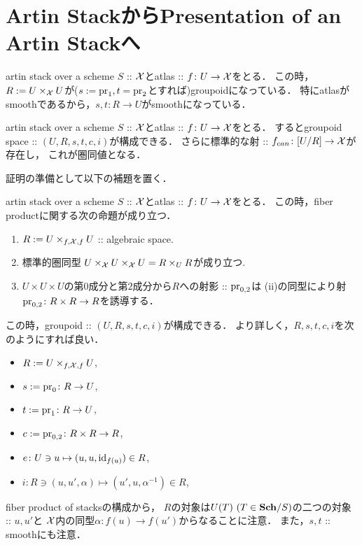 \documentclass[a4paper, dvipdfmx]{jsarticle}
\begin{document}
\section{Artin StackからPresentation of an Artin Stackへ}
    artin stack over a scheme $S$ :: $\stX$とatlas :: $f \colon U \to \stX$をとる．
    この時，$R:=U \times_{\stX} U$が($s:=\pr_1, t=\pr_2$とすれば)groupoidになっている．
    特にatlasがsmoothであるから，$s,t \colon R \to U$がsmoothになっている．

    \begin{Thm}[\cite{SP} 04T4, 04T5]
        artin stack over a scheme $S$ :: $\stX$とatlas :: $f \colon U \to \stX$をとる．
        するとgroupoid space :: $(U, R, s,t,c,i)$が構成できる．
        さらに標準的な射 :: $f_{can} \colon [U/R] \to \stX$が存在し，
        これが圏同値となる．
    \end{Thm}

    証明の準備として以下の補題を置く．

    \begin{Lemma}[\cite{SP} 04T4 (1)--(3)]\label{lemm:fiberprod}
        artin stack over a scheme $S$ :: $\stX$とatlas :: $f \colon U \to \stX$をとる．
        この時，fiber productに関する次の命題が成り立つ．
        \begin{enumerate}
            \item
                $R:=U \times_{f,\stX,f} U$ :: algebraic space.
            \item
                標準的圏同型 $U \times_{\stX} U \times_{\stX} U=R \times_{U} R$が成り立つ.
            \item
                $U \times U \times U$の第$0$成分と第$2$成分から$R$への射影 :: $\pr_{0,2}$は
                (ii)の同型により射$\pr_{0,2} \colon R \times R \to R$を誘導する．
        \end{enumerate}
    \end{Lemma}

    \begin{Lemma}[\cite{SP} 04T4 (4), 04T5 (1)]
        この時，groupoid :: $(U, R, s,t,c,i)$が構成できる．
        より詳しく，$R, s,t,c,i$を次のようにすれば良い．
        \begin{itemize}
            \item $R:=U \times_{f,\stX,f} U$,
            \item $s:=\pr_0 \colon R \to U$,
            \item $t:=\pr_1 \colon R \to U$,
            \item $c:=\pr_{0,2} \colon R \times R \to R$,
            \item $e \colon U \ni u  \mapsto (u,u,\id[f(u)]) \in R$,
            \item $i \colon R \ni (u,u',\alpha) \mapsto (u',u,\alpha^{-1}) \in R$,
        \end{itemize}
        fiber product of stacksの構成から，
        $R$の対象は$U(T)\ (T \in \Sch/S)$の二つの対象 :: $u, u'$と
        $\stX$内の同型$\alpha \colon f(u) \to f(u')$からなることに注意．
        また，$s,t$ :: smoothにも注意．
    \end{Lemma}
\end{document}
